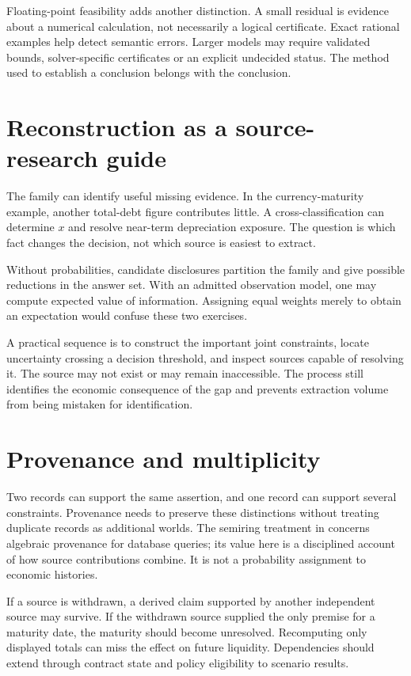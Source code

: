 Floating-point feasibility adds another distinction. A small residual is evidence about a numerical calculation, not necessarily a logical certificate. Exact rational examples help detect semantic errors. Larger models may require validated bounds, solver-specific certificates or an explicit undecided status. The method used to establish a conclusion belongs with the conclusion.

\section{Reconstruction as a source-research guide}
The family can identify useful missing evidence. In the currency-maturity example, another total-debt figure contributes little. A cross-classification can determine $x$ and resolve near-term depreciation exposure. The question is which fact changes the decision, not which source is easiest to extract.

Without probabilities, candidate disclosures partition the family and give possible reductions in the answer set. With an admitted observation model, one may compute expected value of information. Assigning equal weights merely to obtain an expectation would confuse these two exercises.

A practical sequence is to construct the important joint constraints, locate uncertainty crossing a decision threshold, and inspect sources capable of resolving it. The source may not exist or may remain inaccessible. The process still identifies the economic consequence of the gap and prevents extraction volume from being mistaken for identification.

\section{Provenance and multiplicity}
Two records can support the same assertion, and one record can support several constraints. Provenance needs to preserve these distinctions without treating duplicate records as additional worlds. The semiring treatment in \citet{green2007} concerns algebraic provenance for database queries; its value here is a disciplined account of how source contributions combine. It is not a probability assignment to economic histories.

If a source is withdrawn, a derived claim supported by another independent source may survive. If the withdrawn source supplied the only premise for a maturity date, the maturity should become unresolved. Recomputing only displayed totals can miss the effect on future liquidity. Dependencies should extend through contract state and policy eligibility to scenario results.

